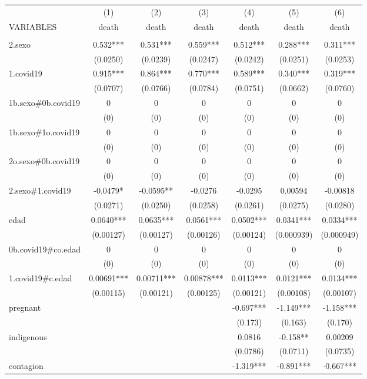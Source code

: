 \documentclass[]{article}
\begin{document}
\begin{tabular}{lcccccc} \hline
 & (1) & (2) & (3) & (4) & (5) & (6) \\
VARIABLES & death & death & death & death & death & death \\ \hline
 &  &  &  &  &  &  \\
2.sexo & 0.532*** & 0.531*** & 0.559*** & 0.512*** & 0.288*** & 0.311*** \\
 & (0.0250) & (0.0239) & (0.0247) & (0.0242) & (0.0251) & (0.0253) \\
1.covid19 & 0.915*** & 0.864*** & 0.770*** & 0.589*** & 0.340*** & 0.319*** \\
 & (0.0707) & (0.0766) & (0.0784) & (0.0751) & (0.0662) & (0.0760) \\
1b.sexo\#0b.covid19 & 0 & 0 & 0 & 0 & 0 & 0 \\
 & (0) & (0) & (0) & (0) & (0) & (0) \\
1b.sexo\#1o.covid19 & 0 & 0 & 0 & 0 & 0 & 0 \\
 & (0) & (0) & (0) & (0) & (0) & (0) \\
2o.sexo\#0b.covid19 & 0 & 0 & 0 & 0 & 0 & 0 \\
 & (0) & (0) & (0) & (0) & (0) & (0) \\
2.sexo\#1.covid19 & -0.0479* & -0.0595** & -0.0276 & -0.0295 & 0.00594 & -0.00818 \\
 & (0.0271) & (0.0250) & (0.0258) & (0.0261) & (0.0275) & (0.0280) \\
edad & 0.0640*** & 0.0635*** & 0.0561*** & 0.0502*** & 0.0341*** & 0.0334*** \\
 & (0.00127) & (0.00127) & (0.00126) & (0.00124) & (0.000939) & (0.000949) \\
0b.covid19\#co.edad & 0 & 0 & 0 & 0 & 0 & 0 \\
 & (0) & (0) & (0) & (0) & (0) & (0) \\
1.covid19\#c.edad & 0.00691*** & 0.00711*** & 0.00878*** & 0.0113*** & 0.0121*** & 0.0134*** \\
 & (0.00115) & (0.00121) & (0.00125) & (0.00121) & (0.00108) & (0.00107) \\
pregnant &  &  &  & -0.697*** & -1.149*** & -1.158*** \\
 &  &  &  & (0.173) & (0.163) & (0.170) \\
indigenous &  &  &  & 0.0816 & -0.158** & 0.00209 \\
 &  &  &  & (0.0786) & (0.0711) & (0.0735) \\
contagion &  &  &  & -1.319*** & -0.891*** & -0.667*** \\

\end{tabular}
\end{document}
